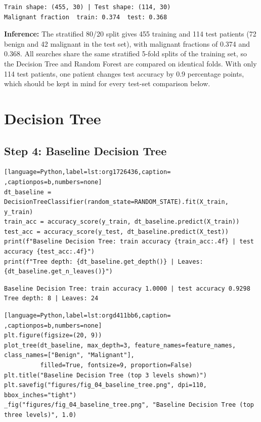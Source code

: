 \documentclass[11pt]{article}
\begin{document}
\begin{verbatim}
Train shape: (455, 30) | Test shape: (114, 30)
Malignant fraction  train: 0.374  test: 0.368
\end{verbatim}


\textbf{Inference:} The stratified 80/20 split gives 455 training and 114 test patients (72 benign and 42
malignant in the test set), with malignant fractions of 0.374 and 0.368. All searches share
the same stratified 5-fold splits of the training set, so the Decision Tree and Random
Forest are compared on identical folds. With only 114 test patients, one patient changes
test accuracy by 0.9 percentage points, which should be kept in mind for every test-set
comparison below.

\section*{Decision Tree}
\label{sec:org9263bc8}


\subsection*{Step 4: Baseline Decision Tree}
\label{sec:orgc5becb1}

\begin{lstlisting}[language=Python,label=lst:org1726436,caption= ,captionpos=b,numbers=none]
dt_baseline = DecisionTreeClassifier(random_state=RANDOM_STATE).fit(X_train, y_train)
train_acc = accuracy_score(y_train, dt_baseline.predict(X_train))
test_acc = accuracy_score(y_test, dt_baseline.predict(X_test))
print(f"Baseline Decision Tree: train accuracy {train_acc:.4f} | test accuracy {test_acc:.4f}")
print(f"Tree depth: {dt_baseline.get_depth()} | Leaves: {dt_baseline.get_n_leaves()}")
\end{lstlisting}

\begin{verbatim}
Baseline Decision Tree: train accuracy 1.0000 | test accuracy 0.9298
Tree depth: 8 | Leaves: 24
\end{verbatim}

\begin{lstlisting}[language=Python,label=lst:orgd411bb6,caption= ,captionpos=b,numbers=none]
plt.figure(figsize=(20, 9))
plot_tree(dt_baseline, max_depth=3, feature_names=feature_names, class_names=["Benign", "Malignant"],
          filled=True, fontsize=9, proportion=False)
plt.title("Baseline Decision Tree (top 3 levels shown)")
plt.savefig("figures/fig_04_baseline_tree.png", dpi=110, bbox_inches="tight")
_fig("figures/fig_04_baseline_tree.png", "Baseline Decision Tree (top three levels)", 1.0)
\end{lstlisting}
\end{document}
